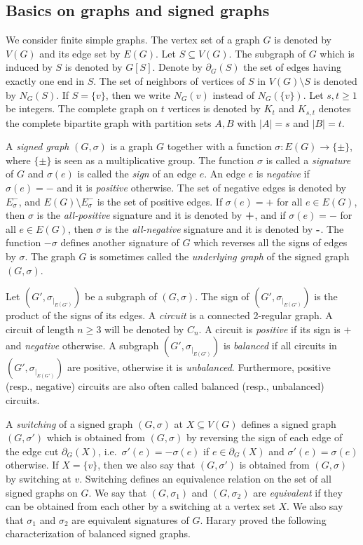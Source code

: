 \documentclass[a4paper,11pt]{article}
\theoremstyle{remark}
\begin{document}
\subsection{Basics on graphs and signed graphs}
We consider finite simple graphs. The vertex set of a graph $G$ is denoted by $V(G)$
and its edge set by $E(G)$. Let $S \subseteq V(G)$. The subgraph of $G$ which is induced by $S$ is denoted by $G[S]$. 
Denote by $\partial_G(S)$ the set of edges having exactly one end in $S$.
The set of neighbors of vertices of $S$ in $V(G) \setminus S$
is denoted by $N_G(S)$. If $S = \{v\}$, then we write $N_G(v)$ instead of 
$N_G(\{v\})$. Let $s,t \geq 1$ be integers. The complete graph on 
$t$ vertices is denoted by $K_t$ and $K_{s,t}$ denotes the complete bipartite graph 
with partition sets $A, B$ with $\vert A \vert = s$ and $\vert B \vert = t$.


A \emph{signed graph} $(G,\sigma)$ is a graph $G$ together with a function 
$\sigma : E(G) \rightarrow \{ \pm  \}$, where $\{ \pm \}$ is seen as a multiplicative group.
The function $\sigma$ is called a \emph{signature} of $G$ and $\sigma(e)$ is called the 
\emph{sign} of an edge $e$. An edge $e$ is \emph{negative} if $\sigma(e) = -$ and
it is \emph{positive} otherwise. 
The set of negative edges is denoted by $E_{\sigma}^-$, and 
$E(G) \setminus E_{\sigma}^-$ is the set of positive edges. 
If $\sigma(e)=+$ for all $e \in E(G)$, then $\sigma$ is the \emph{all-positive} signature and 
it is denoted by $\texttt{\bf +}$,
and if $\sigma(e)=-$ for all $e \in E(G)$, then $\sigma$ is the \emph{all-negative} signature and it is denoted by $\texttt{\bf -}$.
The function $-\sigma$ defines another signature of $G$ which reverses all the signs of edges by $\sigma$.
The graph $G$ is sometimes called the \emph{underlying graph} of the signed graph $(G,\sigma)$.  

Let $(G',\sigma_{|_{E(G')}})$ be a subgraph of $(G,\sigma)$. 
The sign of $(G',\sigma_{|_{E(G')}})$ is the product of the signs
of its edges. 
A \emph{circuit} is a connected 2-regular graph. A circuit of length $n \geq 3$ will be denoted by $C_n$.
A circuit is \emph{positive} if its sign is $+$ and \emph{negative} otherwise. 
A subgraph $(G',\sigma_{|_{E(G')}})$ is \emph{balanced}
 if all circuits in $(G',\sigma_{|_{E(G')}})$ are positive, otherwise it is \emph{unbalanced}. Furthermore, 
positive (resp., negative) circuits are also often 
called balanced (resp., unbalanced) circuits. 


A \emph{switching} of a signed graph $(G,\sigma)$ at $X \subseteq V(G)$ defines a signed graph $(G,\sigma')$ which is obtained from $(G,\sigma)$ by reversing the sign of each edge of the edge cut $\partial_G(X)$, 
i.e.~$\sigma'(e) = - \sigma(e)$ if $e \in \partial_G(X)$ and
$\sigma'(e) = \sigma(e)$ otherwise.
If $X= \{v\}$, then we also say that 
$(G,\sigma')$ is obtained from $(G,\sigma)$ by switching at $v$.
Switching defines an equivalence relation on the set of all signed graphs on $G$. 
We say that $(G,\sigma_1)$ and $(G,\sigma_2)$ are \emph{equivalent} if they can be obtained from each other by a switching at a vertex set $X$.  
We also say that $\sigma_1$ and $\sigma_2$ are equivalent signatures of $G$.
Harary \cite{Balance} proved the following characterization of balanced signed graphs.
\end{document}
